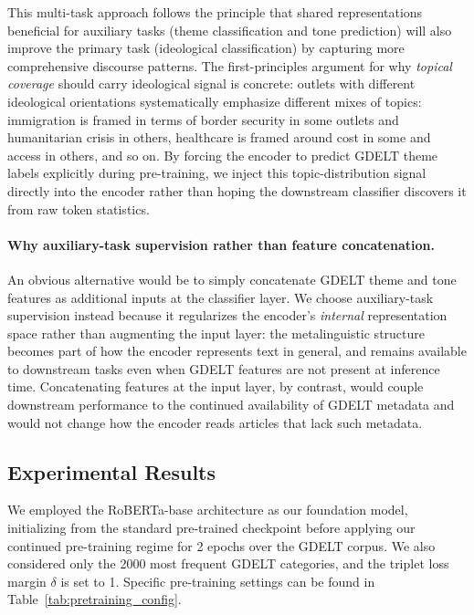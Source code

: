 This multi-task approach follows the principle that shared representations beneficial for auxiliary tasks (theme classification and tone prediction) will also improve the primary task (ideological classification) by capturing more comprehensive discourse patterns. The first-principles argument for why \emph{topical coverage} should carry ideological signal is concrete: outlets with different ideological orientations systematically emphasize different mixes of topics: immigration is framed in terms of border security in some outlets and humanitarian crisis in others, healthcare is framed around cost in some and access in others, and so on. By forcing the encoder to predict GDELT theme labels explicitly during pre-training, we inject this topic-distribution signal directly into the encoder rather than hoping the downstream classifier discovers it from raw token statistics.

\paragraph{Why auxiliary-task supervision rather than feature concatenation.} An obvious alternative would be to simply concatenate GDELT theme and tone features as additional inputs at the classifier layer. We choose auxiliary-task supervision instead because it regularizes the encoder's \emph{internal} representation space rather than augmenting the input layer: the metalinguistic structure becomes part of how the encoder represents text in general, and remains available to downstream tasks even when GDELT features are not present at inference time. Concatenating features at the input layer, by contrast, would couple downstream performance to the continued availability of GDELT metadata and would not change how the encoder reads articles that lack such metadata.

\subsection{Experimental Results}
\label{sec:continued-pretraining-results}

We employed the RoBERTa-base architecture \citep{liu2019roberta} as our foundation model, initializing from the standard pre-trained checkpoint before applying our continued pre-training regime for 2 epochs over the GDELT corpus. We also considered only the 2000 most frequent GDELT categories, and the triplet loss margin $\delta$ is set to 1. Specific pre-training settings can be found in Table~\ref{tab:pretraining_config}.

